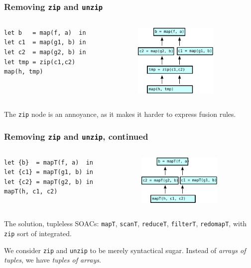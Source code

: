 \documentclass[rgb,dvipsnames]{beamer}
\begin{document}
\begin{frame}[fragile]
  \frametitle{Removing \texttt{zip} and \texttt{unzip}}

  \begin{columns}
    \begin{column}{0.5\textwidth}
\begin{lstlisting}
let b   = map(f, a)  in
let c1  = map(g1, b) in
let c2  = map(g2, b) in
let tmp = zip(c1,c2)
map(h, tmp)
\end{lstlisting}
    \end{column}
    \begin{column}{0.5\textwidth}
      \includegraphics[width=4cm]{img/simpledataflow.pdf}
    \end{column}
  \end{columns}
  \vspace{0.5cm}

  The \texttt{zip} node is an annoyance, as it makes it harder to
  express fusion rules.
\end{frame}

\begin{frame}[fragile]
  \frametitle{Removing \texttt{zip} and \texttt{unzip}, continued}

  \begin{columns}
    \begin{column}{0.6\textwidth}
\begin{lstlisting}
let {b}  = mapT(f, a)  in
let {c1} = mapT(g1, b) in
let {c2} = mapT(g2, b) in
mapT(h, c1, c2)
\end{lstlisting}
    \end{column}
    \begin{column}{0.4\textwidth}
      \includegraphics[width=4cm]{img/simpledataflow-notuples.pdf}
    \end{column}
  \end{columns}
  \vspace{0.5cm}

  The solution, tupleless SOACs: \texttt{mapT}, \texttt{scanT},
  \texttt{reduceT}, \texttt{filterT}, \texttt{redomapT}, with
  \texttt{zip} sort of integrated.

  We consider \texttt{zip} and \texttt{unzip} to be merely syntactical
  sugar.  Instead of \textit{arrays of tuples}, we have \textit{tuples
    of arrays}.
\end{frame}
\end{document}

